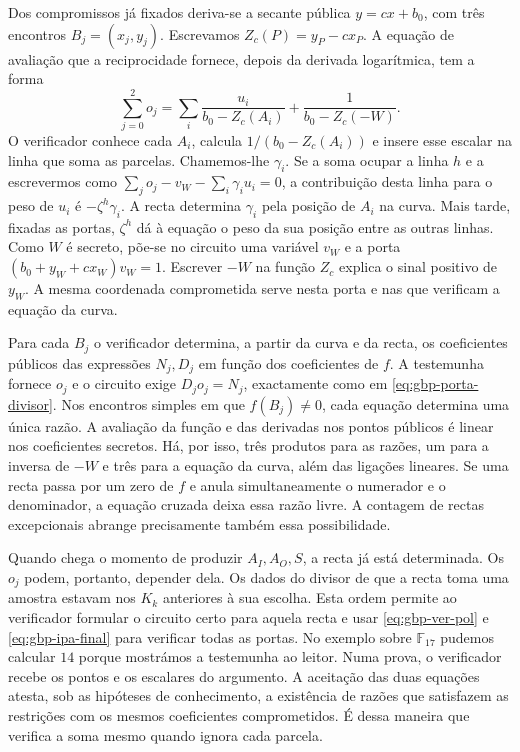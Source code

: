 Dos compromissos já fixados deriva-se a secante pública \(y=c x+b_0\),
com três encontros \(B_j=(x_j,y_j)\). Escrevamos
\(Z_c(P)=y_P-cx_P\). A equação de avaliação que a reciprocidade fornece,
depois da derivada logarítmica, tem a forma
\begin{equation}
 \sum_{j=0}^2 o_j=\sum_i \frac{u_i}{b_0-Z_c(A_i)}
                           +\frac{1}{b_0-Z_c(-W)} .
 \label{eq:gbp-recip-circuito}
\end{equation}
O verificador conhece cada \(A_i\), calcula
\(1/(b_0-Z_c(A_i))\) e insere esse escalar na linha que soma as
parcelas. Chamemos-lhe \(\gamma_i\). Se a soma ocupar a linha \(h\)
e a escrevermos como \(\sum_j o_j-v_W-\sum_i\gamma_i u_i=0\), a
contribuição desta linha para o peso de \(u_i\) é \(-\zeta^h\gamma_i\).
A recta determina \(\gamma_i\) pela posição de \(A_i\) na curva.
Mais tarde, fixadas as portas, \(\zeta^h\) dá à equação o peso da
sua posição entre as outras linhas. Como \(W\) é secreto, põe-se no circuito uma variável \(v_W\)
e a porta \((b_0+y_W+cx_W)v_W=1\). Escrever \(-W\) na função \(Z_c\)
explica o sinal positivo de \(y_W\). A mesma coordenada comprometida
serve nesta porta e nas que verificam a equação da curva.

Para cada \(B_j\) o verificador determina, a partir da curva e da recta,
os coeficientes públicos das expressões \(N_j,D_j\) em função dos
coeficientes de \(f\). A testemunha fornece \(o_j\) e o circuito exige
\(D_j o_j=N_j\), exactamente como em \eqref{eq:gbp-porta-divisor}.
Nos encontros simples em que \(f(B_j)\ne0\), cada equação determina
uma única razão. A avaliação da função e das derivadas nos pontos
públicos é linear nos coeficientes secretos. Há, por isso, três produtos
para as razões, um para a inversa de \(-W\) e três para a equação da
curva, além das ligações lineares. Se uma recta passa por um zero de
\(f\) e anula simultaneamente o numerador e o denominador, a equação
cruzada deixa essa razão livre. A contagem de rectas excepcionais
abrange precisamente também essa possibilidade.

Quando chega o momento de produzir \(A_I,A_O,S\), a recta já está
determinada. Os \(o_j\) podem, portanto, depender dela. Os dados do
divisor de que a recta toma uma amostra estavam nos \(K_k\) anteriores
à sua escolha. Esta ordem permite ao verificador formular o circuito
certo para aquela recta e usar \eqref{eq:gbp-ver-pol} e
\eqref{eq:gbp-ipa-final} para verificar todas as portas. No exemplo
sobre \(\mathbb F_{17}\) pudemos calcular \(14\) porque mostrámos a
testemunha ao leitor. Numa prova, o verificador recebe os pontos e os
escalares do argumento. A aceitação das duas equações atesta, sob as
hipóteses de conhecimento, a existência de razões que satisfazem as
restrições com os mesmos coeficientes comprometidos. É dessa maneira
que verifica a soma mesmo quando ignora cada parcela.

